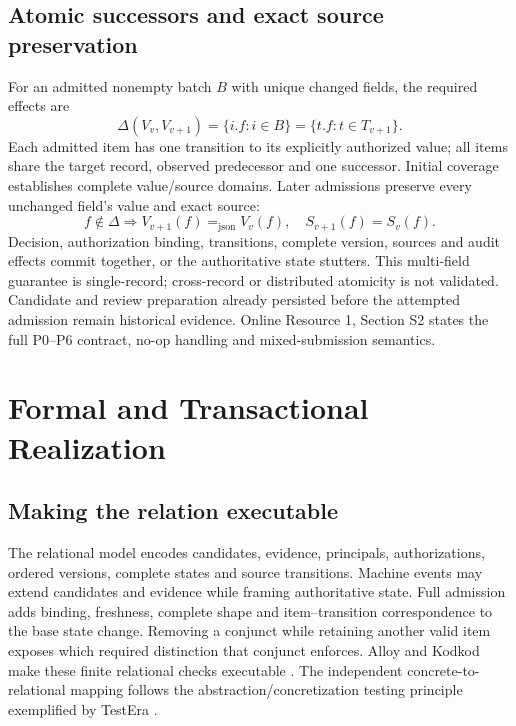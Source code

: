 \documentclass[10pt,a4paper,twocolumn]{article}
\newcommand{\jeq}{\mathrel{=_{\mathrm{json}}}}
\begin{document}
\subsection{Atomic successors and exact source preservation}
For an admitted nonempty batch $B$ with unique changed fields, the required effects are
\begin{equation}
\Delta(V_v,V_{v+1})=\{i.f:i\in B\}=\{t.f:t\in T_{v+1}\}.
\end{equation}
Each admitted item has one transition to its explicitly authorized value; all items share the target record, observed predecessor and one successor. Initial coverage establishes complete value/source domains. Later admissions preserve every unchanged field's value and exact source:
\begin{equation}
f\notin\Delta\Rightarrow V_{v+1}(f)\jeq V_v(f),\quad S_{v+1}(f)=S_v(f).
\end{equation}
Decision, authorization binding, transitions, complete version, sources and audit effects commit together, or the authoritative state stutters. This multi-field guarantee is single-record; cross-record or distributed atomicity is not validated. Candidate and review preparation already persisted before the attempted admission remain historical evidence. Online Resource 1, Section S2 states the full P0--P6 contract, no-op handling and mixed-submission semantics.

\section{Formal and Transactional \mbox{Realization}}
\subsection{Making the relation executable}
The relational model encodes candidates, evidence, principals, authorizations, ordered versions, complete states and source transitions. Machine events may extend candidates and evidence while framing authoritative state. Full admission adds binding, freshness, complete shape and item--transition correspondence to the base state change. Removing a conjunct while retaining another valid item exposes which required distinction that conjunct enforces. Alloy and Kodkod make these finite relational checks executable \citep{jackson2002alloy,torlak2007kodkod}. The independent concrete-to-relational mapping follows the abstraction/concretization testing principle exemplified by TestEra \citep{marinov2001testera}.
\end{document}
